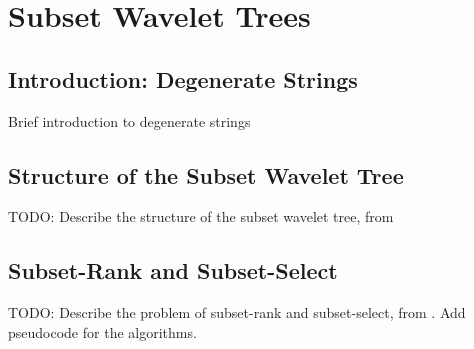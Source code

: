 
\chapter{Subset Wavelet Trees}
\label{ch:Chapter4}

\section{Introduction: Degenerate Strings}
Brief introduction to degenerate strings \cite{fischer1974string, alzamel2018degenerate}

\section{Structure of the Subset Wavelet Tree}
TODO: Describe the structure of the subset wavelet tree, from \cite{SubsetWT}

\section{Subset-Rank and Subset-Select}
TODO: Describe the problem of subset-rank and subset-select, from \cite{SubsetWT}. Add pseudocode for the algorithms.

